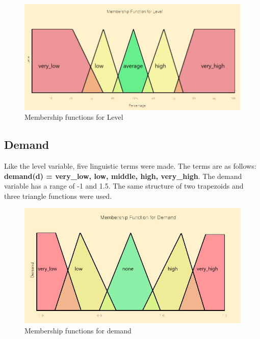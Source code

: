 \begin{figure}[ht]
	\begin{center}
		\advance\leftskip-3cm
		\advance\rightskip-3cm
		\includegraphics[keepaspectratio=true,scale=0.6]{__resources/level.jpg}
		\caption{Membership functions for Level}
		\label{member1}
	\end{center}
\end{figure}

\subsection*{Demand}
Like the level variable, five linguistic terms were made. The terms are as follows: \textbf{demand(d) = {very\_low, low, middle, high, very\_high}}. The demand variable has a range of -1 and 1.5. The same structure of two trapezoids and three triangle functions were used. 

\begin{figure}[ht]
	\begin{center}
		\advance\leftskip-3cm
		\advance\rightskip-3cm
		\includegraphics[keepaspectratio=true,scale=0.6]{__resources/demand.jpg}
		\caption{Membership functions for demand}
		\label{member2}
	\end{center}
\end{figure}


